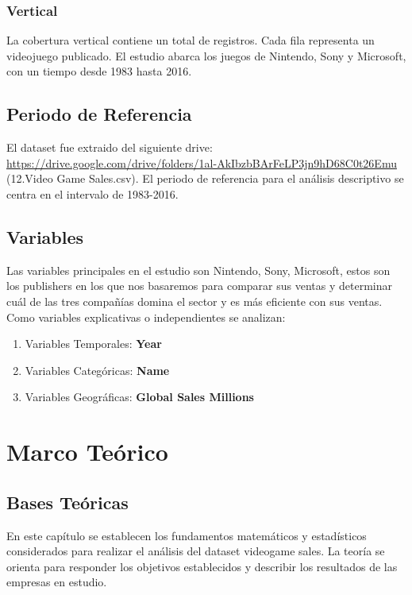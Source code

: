 \documentclass[oneside,11pt]{Latex/Classes/PhDthesisPSnPDF}
\begin{document}
\subsection{Vertical}

La cobertura vertical contiene un total de registros. Cada fila
representa un videojuego publicado. El estudio abarca los juegos de
Nintendo, Sony y Microsoft, con un tiempo desde 1983 hasta 2016.

\section{Periodo de Referencia}

El dataset fue extraido del siguiente drive:
\url{https://drive.google.com/drive/folders/1al-AkIbzbBArFeLP3jn9hD68C0t26Emu}
(12.Video Game Sales.csv). El periodo de referencia para el análisis
descriptivo se centra en el intervalo de 1983-2016.

\section{Variables}

Las variables principales en el estudio son Nintendo, Sony, Microsoft,
estos son los publishers en los que nos basaremos para comparar sus
ventas y determinar cuál de las tres compañías domina el sector y es más
eficiente con sus ventas. Como variables explicativas o independientes
se analizan:

\begin{enumerate}
  \item Variables Temporales: \textbf{Year}
  \item Variables Categóricas: \textbf{Name}
  \item Variables Geográficas: \textbf{Global Sales Millions}
\end{enumerate}

\chapter{Marco Teórico}

\section{Bases Teóricas}

En este capítulo se establecen los fundamentos matemáticos y
estadísticos considerados para realizar el análisis del dataset
videogame sales. La teoría se orienta para responder los objetivos
establecidos y describir los resultados de las empresas en estudio.
\end{document}
